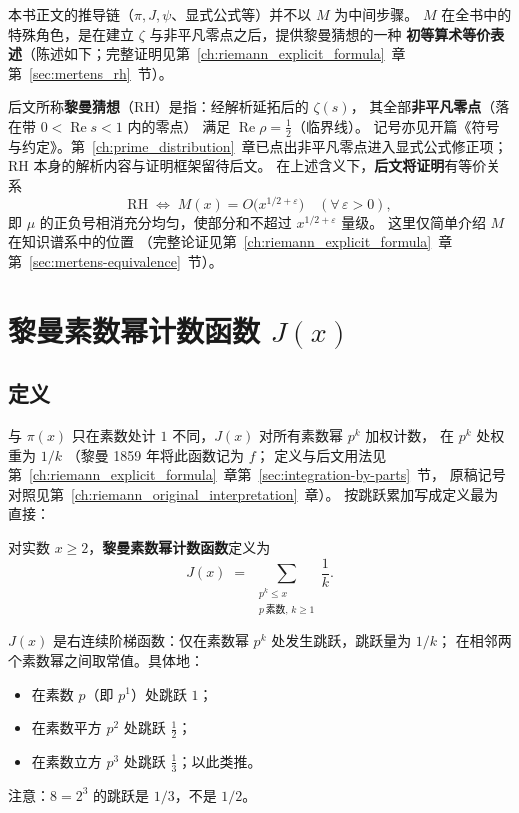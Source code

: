 本书正文的推导链（$\pi,J,\psi$、显式公式等）并不以 $M$ 为中间步骤。
$M$ 在全书中的特殊角色，是在建立 $\zeta$ 与非平凡零点之后，提供黎曼猜想的一种
\textbf{初等算术等价表述}（陈述如下；完整证明见第~\ref{ch:riemann_explicit_formula}~章第~\ref{sec:mertens_rh}~节）。

后文所称\textbf{黎曼猜想}（RH）是指：经解析延拓后的 $\zeta(s)$，
其全部\textbf{非平凡零点}（落在带 $0<\operatorname{Re}s<1$ 内的零点）
满足 $\operatorname{Re}\rho=\frac12$（临界线）。
记号亦见开篇《符号与约定》。第~\ref{ch:prime_distribution}~章已点出非平凡零点进入显式公式修正项；
RH 本身的解析内容与证明框架留待后文。
在上述含义下，\textbf{后文将证明}有等价关系
\[
  \mathrm{RH}
  \;\Longleftrightarrow\;
  M(x)=O\!\bigl(x^{1/2+\varepsilon}\bigr)
  \quad(\forall\,\varepsilon>0),
\]
即 $\mu$ 的正负号相消充分均匀，使部分和不超过 $x^{1/2+\varepsilon}$ 量级。
这里仅简单介绍 $M$ 在知识谱系中的位置
（完整论证见第~\ref{ch:riemann_explicit_formula}~章第~\ref{sec:mertens-equivalence}~节）。

\section{黎曼素数幂计数函数 \texorpdfstring{$J(x)$}{J(x)}}\label{sec:riemann_prime_power}
\label{sec:J}

\subsection{定义}
与 $\pi(x)$ 只在素数处计 $1$ 不同，$J(x)$ 对所有素数幂 $p^k$ 加权计数，
在 $p^k$ 处权重为 $1/k$
（黎曼 1859 年将此函数记为 $f$；
定义与后文用法见第~\ref{ch:riemann_explicit_formula}~章第~\ref{sec:integration-by-parts}~节，
原稿记号对照见第~\ref{ch:riemann_original_interpretation}~章）。
按跳跃累加写成定义最为直接：

\begin{definition}{}{}
对实数 $x \ge 2$，\textbf{黎曼素数幂计数函数}定义为
\begin{equation}
  J(x)
  \;=\;
  \sum_{\substack{p^k \le x \\ p\,\text{素数},\, k \ge 1}}
  \frac{1}{k}.
\label{eq:J_def}
\end{equation}
\end{definition}

$J(x)$ 是右连续阶梯函数：仅在素数幂 $p^k$ 处发生跳跃，跳跃量为 $1/k$；
在相邻两个素数幂之间取常值。具体地：
\begin{itemize}
  \item 在素数 $p$（即 $p^1$）处跳跃 $1$；
  \item 在素数平方 $p^2$ 处跳跃 $\frac{1}{2}$；
  \item 在素数立方 $p^3$ 处跳跃 $\frac{1}{3}$；以此类推。
\end{itemize}
注意：$8=2^3$ 的跳跃是 $1/3$，不是 $1/2$。

